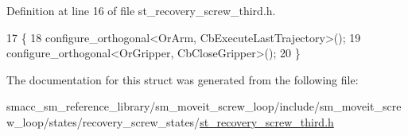 Definition at line 16 of file st\+\_\+recovery\+\_\+screw\+\_\+third.\+h.


\begin{DoxyCode}
17             \{
18                 configure\_orthogonal<OrArm, CbExecuteLastTrajectory>();
19                 configure\_orthogonal<OrGripper, CbCloseGripper>();
20             \}
\end{DoxyCode}


The documentation for this struct was generated from the following file\+:\begin{DoxyCompactItemize}
\item 
smacc\+\_\+sm\+\_\+reference\+\_\+library/sm\+\_\+moveit\+\_\+screw\+\_\+loop/include/sm\+\_\+moveit\+\_\+screw\+\_\+loop/states/recovery\+\_\+screw\+\_\+states/\hyperlink{st__recovery__screw__third_8h}{st\+\_\+recovery\+\_\+screw\+\_\+third.\+h}\end{DoxyCompactItemize}
